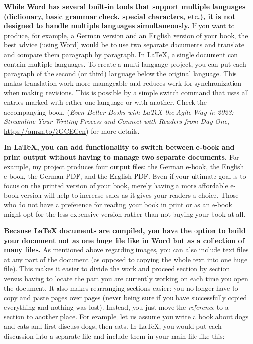 \textbf{While Word has several built-in tools that support multiple languages (dictionary, basic grammar check, special characters, etc.), it is not designed to handle multiple languages simultaneously.} If you want to produce, for example, a German version and an English version of your book, the best advice (using Word) would be to use two separate documents and translate and compare them paragraph by paragraph. In LaTeX, a single document can contain multiple languages. To create a multi-language project, you can put each paragraph of the second (or third) language below the original language. This makes translation work more manageable and reduces work for synchronization when making revisions. This is possible by a simple switch command that uses all entries marked with either one language or with another. Check the accompanying book, (\textit{Even Better Books with LaTeX the Agile Way in 2023: Streamline Your Writing Process and Connect with Readers from Day One}, \url{https://amzn.to/3GCEGen}) for more details.

\textbf{In LaTeX, you can add functionality to switch between e-book and print output without having to manage two separate documents.} For example, my  project produces four output files: the German e-book, the English e-book, the German PDF, and the English PDF. Even if your ultimate goal is to focus on the printed version of your book, merely having a more affordable e-book version will help to increase sales as it gives your readers a choice. Those who do not have a preference for reading your book in print or as an e-book might opt for the less expensive version rather than not buying your book at all.

\textbf{Because LaTeX documents are compiled, you have the option to build your document not as one huge file like in Word but as a collection of many files.} As mentioned above regarding images, you can also include text files at any part of the document (as opposed to copying the whole text into one huge file). This makes it easier to divide the work and proceed section by section versus having to locate the part you are currently working on each time you open the document. It also makes rearranging sections easier: you no longer have to copy and paste pages over pages (never being sure if you have successfully copied everything and nothing was lost). Instead, you just move the \textit{reference} to a section to another place. For example, let us assume you write a book about dogs and cats and first discuss dogs, then cats. In LaTeX, you would put each discussion into a separate file and include them in your main file like this:

